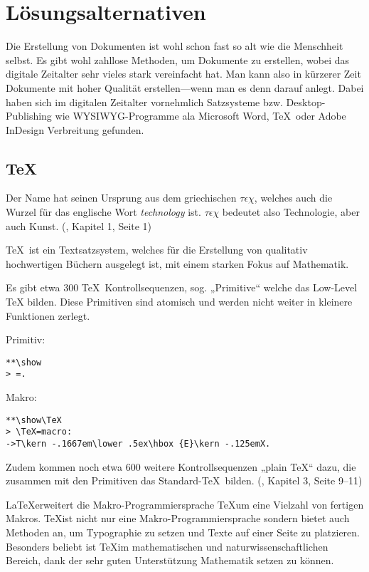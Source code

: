 \chapter{Lösungsalternativen}

Die Erstellung von Dokumenten ist wohl schon fast so alt wie die Menschheit
selbst. Es gibt wohl zahllose Methoden, um Dokumente zu erstellen, wobei
das digitale Zeitalter sehr vieles stark vereinfacht hat. Man kann also
in kürzerer Zeit Dokumente mit hoher Qualität erstellen---wenn man es
denn darauf anlegt. Dabei haben sich im digitalen Zeitalter vornehmlich
Satzsysteme bzw. Desktop-Publishing wie WYSIWYG-Programme
ala Microsoft Word, \TeX~oder Adobe InDesign Verbreitung gefunden.

\section{\TeX}

Der Name hat seinen Ursprung aus dem griechischen $\tau\epsilon\chi$,
welches auch die Wurzel für das englische Wort \emph{technology} ist.
$\tau\epsilon\chi$ bedeutet also Technologie, aber auch Kunst.
(\cite{tex-a}, Kapitel 1, Seite 1)

\TeX~ist ein Textsatzsystem, welches für die Erstellung
von qualitativ hochwertigen Büchern ausgelegt ist, mit einem starken Fokus auf
Mathematik.

Es gibt etwa 300 \TeX~Kontrollsequenzen, sog. „Primitive“ welche das
Low-Level TeX bilden. Diese Primitiven sind atomisch und werden nicht weiter
in kleinere Funktionen zerlegt.

Primitiv:

\begin{verbatim}
**\show
> =.
\end{verbatim}

Makro:

\begin{verbatim}
**\show\TeX
> \TeX=macro:
->T\kern -.1667em\lower .5ex\hbox {E}\kern -.125emX.
\end{verbatim}

Zudem kommen noch etwa 600 weitere Kontrollsequenzen „plain \TeX“ dazu,
die zusammen mit den Primitiven das Standard-\TeX~bilden.
(\cite{tex-a}, Kapitel 3, Seite 9--11)

\LaTeX erweitert die Makro-Programmiersprache \TeX um eine Vielzahl von
fertigen Makros. \TeX ist nicht nur eine Makro-Programmiersprache sondern
bietet auch Methoden an, um Typographie zu setzen und Texte auf einer Seite
zu platzieren. Besonders beliebt ist \TeX im mathematischen und
naturwissenschaftlichen Bereich, dank der sehr guten Unterstützung Mathematik
setzen zu können.

